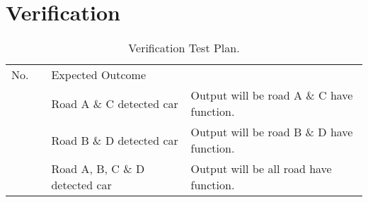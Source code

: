 \section{Verification}
\newcommand*{\mline}[1]{%
	\begingroup
	\renewcommand*{\arraystretch}{1.8}%
	\begin{tabular}[c]{@{}>{\raggedright\arraybackslash}p{\linewidth}@{}}#1\end{tabular}%
	\endgroup
}
\begin{table}[ht]
	\centering
	\renewcommand\arraystretch{1.8}
	\caption{Verification Test Plan.\label{tab:testplan}}
	\begin{NiceTabular}[t]{c>{\centering\arraybackslash}m{2.5cm}XX}
		\toprule
		No.            &                                                                   & Expected Outcome                                                                                                                                                                                                                                                                                                     \\
		\cmidrule(rl){1-1}\cmidrule(rl){2-3}\cmidrule(rl){4-4}
		 &                                                                   & Road A \& C detected car                                                                                                                                                                 & Output will be road A \& C have function.                                                                                 \\
		               &                                                                                                & Road B \& D detected car                                                                                                                                                                 & Output will be road B \& D have function.                                                                                 \\
		               &                                                                                                & Road A, B, C \& D detected car                                                                                                                                                           & Output will be all road have function.                                                                                    \\

\end{NiceTabular}
\end{table}
